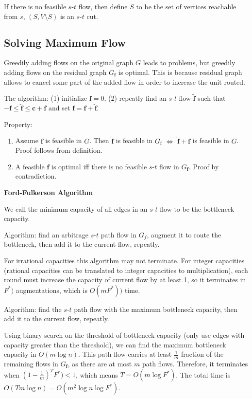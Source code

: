 If there is no feasible $s$-$t$ flow, then define $S$ to be the set of vertices reachable from $s$, $(S, V\setminus S)$ is an $s$-$t$ cut.

\subsection{Solving Maximum Flow}

Greedily adding flows on the original graph $G$ leads to problems, but greedily adding flows on the residual graph $G_{\boldsymbol{f}}$ is optimal. This is because residual graph allows to cancel some part of the added flow in order to increase the unit routed.

The algorithm: (1) initialize $\boldsymbol{f}=0$, (2) repeatly find an $s$-$t$ flow $\tilde{\boldsymbol{f}}$ such that $-\boldsymbol{f} \le \tilde{\boldsymbol{f}} \le \boldsymbol{c} + \boldsymbol{f}$ and set $\boldsymbol{f} = \boldsymbol{f} + \tilde{\boldsymbol{f}}$.

Property:
\begin{enumerate}
    \item Assume $\boldsymbol{f}$ is feasible in $G$. Then $\tilde{\boldsymbol{f}}$ is feasible in $G_{\boldsymbol{f}}$ $\Leftrightarrow$ $\tilde{\boldsymbol{f}} + \boldsymbol{f}$ is feasible in $G$. Proof follows from definition.
    \item A feasible $\boldsymbol{f}$ is optimal iff there is no feasible $s$-$t$ flow in $G_{\boldsymbol{f}}$. Proof by contradiction.
\end{enumerate}

\textbf{Ford-Fulkerson Algorithm}

We call the minimum capacity of all edges in an $s$-$t$ flow to be the bottleneck capacity.

Algorithm: find an arbitrage $s$-$t$ path flow in $G_f$, augment it to route the bottleneck, then add it to the current flow, repeatly. 

For irrational capacities this algorithm may not terminate. For integer capacities (rational capacities can be translated to integer capacities to multiplication), each round must increase the capacity of current flow by at least 1, so it terminates in $F^*)$ augmentations, which is $O(m F^*))$ time.

Algorithm: find the $s$-$t$ path flow with the maximum bottleneck capacity, then add it to the current flow, repeatly.

Using binary search on the threshold of bottleneck capacity (only use edges with capacity greater than the threshold), we can find the maximum bottleneck capacity in $O(m \log n)$. This path flow carries at least $\frac{1}{m}$ fraction of the remaining flows in $G_{\boldsymbol{f}}$, as there are at most $m$ path flows. Therefore, it terminates when $(1-\frac{1}{m})^T F^*) < 1$, which means $T = O(m \log F^*)$. The total time is $O(T m \log n) = O(m^2 \log n \log F^*)$.

